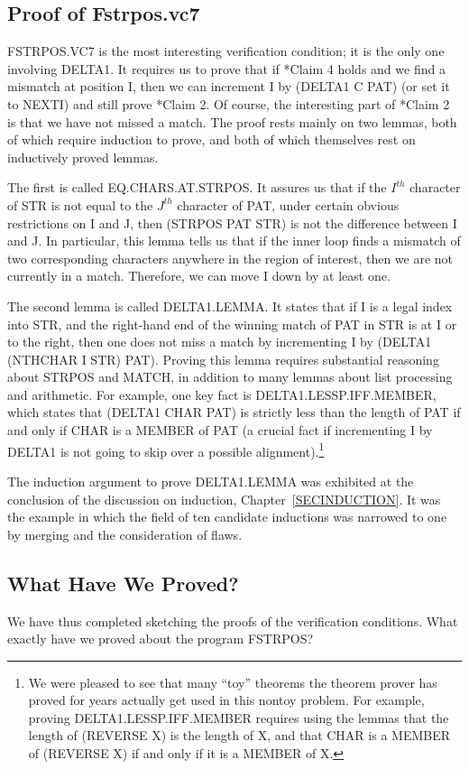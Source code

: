 \documentclass[11pt]{book}
\newcommand{\pubdefaulttextsize}{\large}
\begin{document}
\subsection{Proof of Fstrpos.vc7}
\pubdefaulttextsize
FSTRPOS.VC7 is the most interesting verification condition;
it is the only one involving DELTA1.  It requires us to prove
that if *Claim 4 holds and we find a mismatch at position I, then
we can increment I by (DELTA1 C PAT) (or set it to NEXTI) and still prove *Claim 2.
Of course, the interesting part of *Claim 2 is that we have not
missed a match.
The proof rests mainly on two lemmas, both of
which require induction to prove, and both of which themselves
rest on inductively proved lemmas.

The first is called EQ.CHARS.AT.STRPOS.
It assures us that if the $I^{th}$ character of STR is not equal to the
$J^{th}$ character of PAT, under certain obvious restrictions on I and J,
then (STRPOS PAT STR) is not
the difference between I and J.  In particular, this lemma tells us
that if the inner loop finds a mismatch of two corresponding characters anywhere in the
region of interest, then we are not currently in a match.  Therefore, we can move I down
by at least one.

The second lemma is called DELTA1.LEMMA.
It states that if I is a legal index into STR,
and the right-hand end of the winning match of PAT in STR is at I or to the right,
then one does not miss a match by incrementing I
by (DELTA1 (NTHCHAR I STR) PAT).
Proving this lemma requires substantial reasoning about STRPOS and
MATCH, in addition to many lemmas about list processing
and arithmetic.  For example, one key fact
is DELTA1.LESSP.IFF.MEMBER, which states that (DELTA1 CHAR PAT) is strictly
less than the length of PAT if and only if CHAR is a MEMBER of PAT (a crucial
fact if incrementing I by DELTA1 is not going to skip over
a possible alignment).\footnote{We were pleased to see that many ``toy'' theorems the theorem prover has proved for years actually get used in this nontoy problem. For example, proving DELTA1.LESSP.IFF.MEMBER requires using the lemmas that the length of (REVERSE X) is the length of X, and that CHAR is a MEMBER of (REVERSE X) if and only if it is a MEMBER of X.}

The induction argument to prove DELTA1.LEMMA was exhibited
at the conclusion of the discussion on induction, Chapter~\ref{SECINDUCTION}.
It was the example in which the field of ten candidate inductions was
narrowed to one by merging and the consideration of flaws.
\subsection{What Have We Proved?}
\pubdefaulttextsize
We have thus completed sketching the proofs of the verification
conditions.  What exactly have we proved about the program FSTRPOS?
\end{document}
